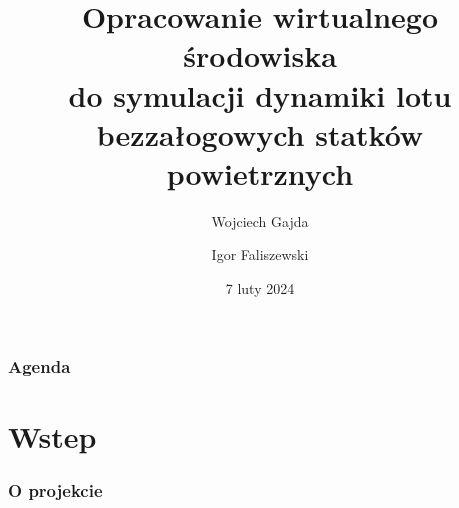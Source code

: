 \documentclass[aspectratio=169]{beamer}
\title{Opracowanie wirtualnego środowiska\\do symulacji dynamiki lotu\\ bezzałogowych statków powietrznych}
\author{Wojciech Gajda \and  Igor Faliszewski}
\institute{Promotor: dr inż. Paweł Kotowski}
\date{7 luty 2024} %
\begin{document}
\sloppy

{
\maketitleframe 
}

\begin{frame}
\frametitle{Agenda}
  \tableofcontents[  
    sectionstyle=show, 
    ]
\end{frame}


\section{Wstep}

\begin{frame}%
	\frametitle{O projekcie}
	\begin{columns}
		\begin{column}{0.33\textwidth}
	   	 	\begin{figure}
	   		 \centering
	    		\end{figure}
		\end{column}
		\begin{column}{0.33\textwidth}
	   	 	\begin{figure}
	   		 \centering

\end{figure}
\end{column}
\end{columns}
\end{frame}
\end{document}
